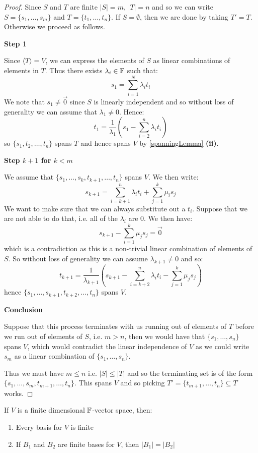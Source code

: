 \documentclass[../main.tex]{subfiles}
\begin{document}
\begin{proof}
  Since $S$ and $T$ are finite $|S| = m$, $|T| = n$ and so we can write $S = \{s_1, \ldots, s_m\}$ and $T = \{t_1, \ldots, t_n\}$.
  If $S = \emptyset$, then we are done by taking $T' = T$.
  Otherwise we proceed as follows.

  \textbf{Step 1}\par
  Since $\langle T \rangle = V$, we can express the elements of $S$ as linear combinations of elements in $T$.
  Thus there exists $\lambda_i \in \mathbb{F}$ such that:
  \[
    s_1 = \sum_{i = 1}^{N} \lambda_i t_i
  \]
  We note that $s_1 \neq \vec{0}$ since $S$ is linearly independent and so without loss of generality we can assume that $\lambda_1 \neq 0$.
  Hence:
  \[
    t_1 = \frac{1}{\lambda_1}\left(s_1 - \sum_{i = 2}^{n} \lambda_i t_i\right)
  \]
  so $\{s_1, t_2, \ldots, t_n\}$ spans $T$ and hence spans $V$ by \cref{spanningLemma} \textbf{(ii)}.

  \textbf{Step $k + 1$ for $k < m$}\par
  We assume that $\{s_1, \ldots, s_k, t_{k + 1}, \ldots, t_n\}$ spans $V$.
  We then write:
  \[
    s_{k + 1} = \sum_{i = k + 1}^{n} \lambda_i t_i + \sum_{j = 1}^{k} \mu_i s_j
  \]
  We want to make sure that we can always substitute out a $t_i$.
  Suppose that we are not able to do that, i.e. all of the $\lambda_i$ are 0.
  We then have:
  \[
    s_{k + 1} - \sum_{i = 1}^{k} \mu_j s_j = \vec{0}
  \]
  which is a contradiction as this is a non-trivial linear combination of elements of $S$.
  So without loss of generality we can assume $\lambda_{k + 1} \neq 0$ and so:
  \[
    t_{k + 1} = \frac{1}{\lambda_{k + 1}}\left(s_{k + 1} - \sum_{i = k + 2}^{n} \lambda_i t_i - \sum_{j = 1}^{k} \mu_j s_j\right)
  \]
  hence $\{s_1, \ldots, s_{k + 1}, t_{k + 2}, \ldots, t_n\}$ spans $V$.

  \textbf{Conclusion}\par
  Suppose that this process terminates with us running out of elements of $T$ before we run out of elements of $S$, i.e. $m > n$, then we would have that $\{s_1, \ldots, s_n\}$ spans $V$, which would contradict the linear independence of $V$ as we could write $s_m$ as a linear combination of $\{s_1, \ldots, s_n\}$.

  Thus we must have $m \leq n$ i.e. $|S| \leq |T|$ and so the terminating set is of the form $\{s_1, \ldots, s_m, t_{m + 1}, \ldots, t_n\}$.
  This spans $V$ and so picking $T' = \{t_{m + 1}, \ldots, t_n\} \subseteq T$ works.
\end{proof}
\begin{corollary}
  If $V$ is a finite dimensional $\mathbb{F}$-vector space, then: \label{basisSize}
  \begin{enumerate}
    \item Every basis for $V$ is finite
    \item If $B_1$ and $B_2$ are finite bases for $V$, then $|B_1| = |B_2|$
  \end{enumerate}
\end{corollary}
\end{document}
